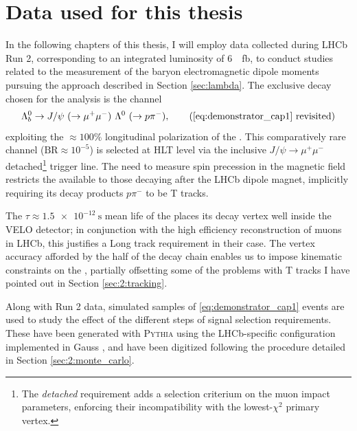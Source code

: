 \section{Data used for this thesis}
\label{sec:2:used_data}
In the following chapters of this thesis, I will employ data collected during LHCb Run 2, corresponding to an integrated luminosity of \SI{6}{\per\femto\barn}, to conduct studies related to the measurement of the \lz baryon electromagnetic dipole moments pursuing the approach described in Section \ref{sec:lambda}.
The exclusive decay chosen for the analysis is the \lbz channel
\begin{equation*}
	\Lambda_b^0 \rightarrow J/\psi~(\rightarrow \mu^+ \mu^-)~\Lambda^0~(\rightarrow p \pi^-), \tag{\ref{eq:demonstrator_cap1} revisited}
\end{equation*}
exploiting the $\approx 100\%$ longitudinal polarization of the \lz.
This comparatively rare channel ($\text{BR} \approx {10}^{-5}$) is selected at HLT level via the inclusive $J/\psi \rightarrow \mu^+\mu^-$ detached\footnote{The \textit{detached} requirement adds a selection criterium on the muon impact parameters, enforcing their incompatibility with the lowest-$\chi^2$ primary vertex.} trigger line.
The need to measure spin precession in the magnetic field restricts the available \lz to those decaying after the LHCb dipole magnet, implicitly requiring its decay products $p\pi^-$ to be T tracks.

The $\tau \approx \SI{1.5e-12}{\second}$ mean life of the \lbz \cite{PDG} places its decay vertex well inside the VELO detector; in conjunction with the high efficiency reconstruction of muons in LHCb, this justifies a Long track requirement in their case.
The \lbz vertex accuracy afforded by the \jpsi half of the decay chain enables us to impose kinematic constraints on the \lz,
partially offsetting some of the problems with T tracks I have pointed out in Section \ref{sec:2:tracking}.

Along with Run 2 data, simulated samples of \eqref{eq:demonstrator_cap1} events are used to study the effect of the different steps of signal selection requirements.
These have been generated with \textsc{Pythia} \cite{Pythia2015} using the LHCb-specific configuration implemented in Gauss \cite{Belyaev_2011}, and have been digitized following the procedure detailed in Section \ref{sec:2:monte_carlo}.